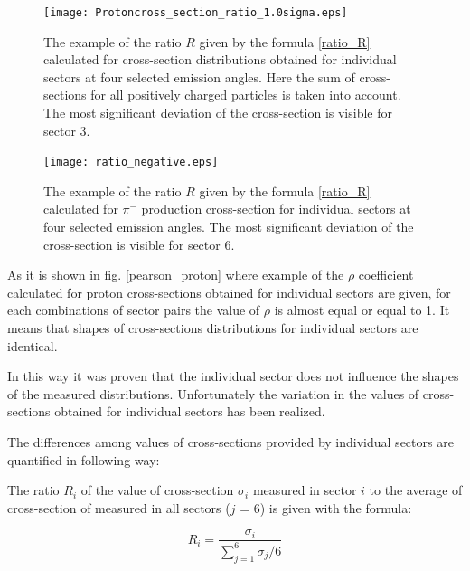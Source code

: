 \begin{figure}[!ht]
    \centering
    \texttt{[image: Protoncross\_section\_ratio\_1.0sigma.eps]}%
    \caption{The example of the ratio $R$ given by the formula \ref{ratio_R} calculated for cross-section distributions obtained for individual sectors at four selected emission angles. Here the sum of cross-sections for all positively charged particles is  taken into account. The most significant deviation of the cross-section is visible for sector 3.}
    \label{ratio_pos}
\end{figure}

\begin{figure}[!ht]
    \centering
    \texttt{[image: ratio\_negative.eps]}%
    \caption{The example of the ratio $R$ given by the formula \ref{ratio_R} calculated for $\pi^{-}$ production cross-section for individual sectors at four selected emission angles. The most significant deviation of the cross-section is visible for sector 6.}
    \label{ratio_neg}
\end{figure}

As it is shown in fig. \ref{pearson_proton} where example of the $\rho$ coefficient calculated for proton cross-sections obtained for individual sectors are given, for each combinations of sector pairs the value of $\rho$ is almost equal or equal to 1. It means that shapes of cross-sections distributions for individual sectors are identical.

In this way it was proven that the individual sector does not influence the shapes of the measured distributions. Unfortunately  
the variation in the values of cross-sections obtained for individual sectors has been realized. 

The differences among values of cross-sections provided by individual sectors are quantified in following way:

The ratio $R_i$ of the value of cross-section $\sigma_i$  measured in sector $i$
to the average of cross-section of measured in all sectors ($j$ = 6) is given with the formula:

\begin{equation}
\label{ratio_R}
R_i = \frac{\sigma_i}{\sum_{j=1}^{6} \sigma_j /6}    
\end{equation}



